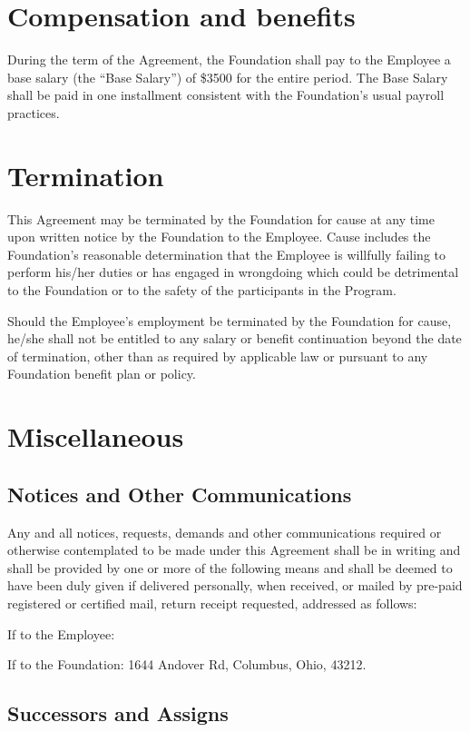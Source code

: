 \documentclass{ross}
\begin{document}
\section{Compensation and benefits}

During the term of the Agreement, the Foundation shall pay to the
Employee a base salary (the ``Base Salary'') of \$3500 for the entire
period.  The Base Salary shall be paid in one installment consistent with
the Foundation's usual payroll practices.

\section{Termination}

This Agreement may be terminated by the Foundation for cause at any time upon written notice by the Foundation to the Employee.  Cause includes the Foundation's reasonable determination that the Employee is willfully failing to perform his/her duties or has engaged in wrongdoing which could be detrimental to the Foundation or to the safety of the participants in the Program.

Should the Employee's employment be terminated by the Foundation for cause, he/she shall not be entitled to any salary or benefit continuation beyond the date of termination, other than as required by applicable law or pursuant to any Foundation benefit plan or policy.

\section{Miscellaneous}

\subsection{Notices and Other Communications}

Any and all notices, requests, demands and other communications required or otherwise contemplated to be made under this Agreement shall be in writing and shall be provided by one or more of the following means and shall be deemed to have been duly given  if delivered personally, when received, or mailed by pre-paid registered or certified mail, return receipt requested, addressed as follows:

If to the Employee: 

If to the Foundation: 1644 Andover Rd, Columbus, Ohio, 43212.

\subsection{Successors and Assigns}
\end{document}
